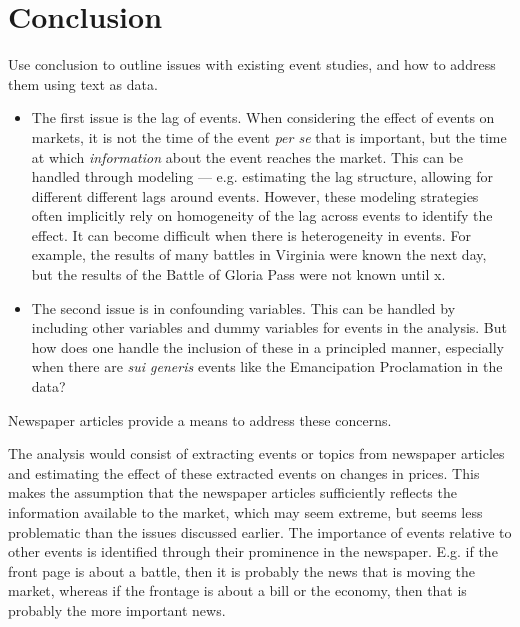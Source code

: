 \section{Conclusion}

Use conclusion to outline issues with existing event studies, and how to address them using text as data.

\begin{itemize}
\item The first issue is the lag of events.
  When considering the effect of events on markets, it is not the time of the event \textit{per se} that is important, but the time at which \textit{information} about the event reaches the market.
  This can be handled through modeling --- e.g. estimating the lag structure, allowing for different different lags around events.
  However, these modeling strategies often implicitly rely on homogeneity of the lag across events to identify the effect.
  It can become difficult when there is heterogeneity in events. For example, the results of many battles in Virginia were known the next day, but the results of the Battle of Gloria Pass were not known until x.

\item The second issue is in confounding variables.
  This can be handled by including other variables and dummy variables for events in the analysis.
  But how does one handle the inclusion of these in a principled manner, especially when there are \textit{sui generis} events like the Emancipation Proclamation in the data?
\end{itemize}

Newspaper articles provide a means to address these concerns.

The analysis would consist of extracting events or topics from newspaper articles and estimating the effect of these extracted events on changes in prices.
This makes the assumption that the newspaper articles sufficiently reflects the information available to the market, which may seem extreme, but seems less problematic than the issues discussed earlier.
The importance of events relative to other events is identified through their prominence in the newspaper. E.g. if the front page is about a battle, then it is probably the news that is moving the market, whereas if the frontage is about a bill or the economy, then that is probably the more important news.

